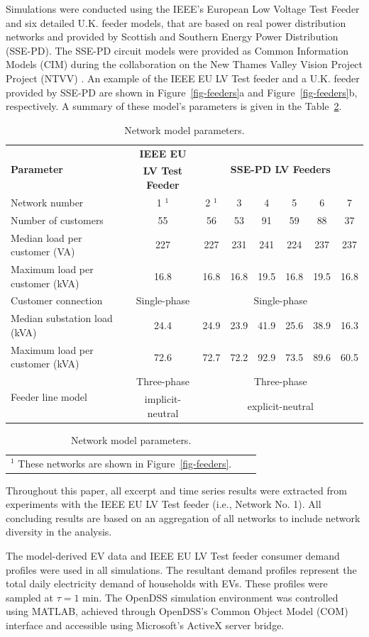 Simulations were conducted using the IEEE's European Low Voltage Test Feeder \cite{EULVFeeder2015} and six detailed U.K. feeder models, that are based on real power distribution networks and provided by Scottish and Southern Energy Power Distribution (SSE-PD). The SSE-PD circuit models were provided as Common Information Models (CIM) during the collaboration on the New Thames Valley Vision Project Project (NTVV) \cite{NTVV2016}. An example of the IEEE EU LV Test feeder and a U.K. feeder provided by SSE-PD are shown in Figure~\ref{fig-feeders}a and Figure~\ref{fig-feeders}b, respectively. A summary of these model's parameters is given in the Table~\ref{table-model-parameters}.

\begin{table}\centering
\begin{tabular}{lccccccc}%
\multirow{2}{*}{\textbf{Parameter}} & \textbf{IEEE EU} & \multicolumn{6}{c}{\multirow{2}{*}{\textbf{SSE-PD LV Feeders}}}\\
 & \textbf{LV Test Feeder} & \\
\hline
Network number & 1 $^1$ & 2 $^1$ & 3 & 4 & 5 & 6 & 7\\
\hline
Number of customers & 55 & 56 & 53 & 91 & 59 & 88 & 37\\
\hline
Median load per customer (VA) & 227 & 227 & 231 & 241 & 224 & 237 & 237\\
\hline
Maximum load per customer (kVA)& 16.8 & 16.8 & 16.8 & 19.5 & 16.8 & 19.5 & 16.8\\
\hline
Customer connection & Single-phase & \multicolumn{6}{c}{Single-phase}\\
\hline
Median substation load (kVA)& 24.4 & 24.9 & 23.9 & 41.9 & 25.6 & 38.9 & 16.3\\
\hline
Maximum load per customer (kVA)& 72.6 & 72.7 & 72.2 & 92.9 & 73.5 & 89.6 & 60.5\\ 
\hline
\multirow{2}{*}{Feeder line model} & Three-phase & \multicolumn{6}{c}{Three-phase}\\
 & implicit-neutral & \multicolumn{6}{c}{explicit-neutral}\\
\end{tabular}
\caption{Network model parameters.}
\label{table-model-parameters}
\begin{tabular}{ccc}
\multicolumn{1}{c}{\footnotesize $^1$ These networks are shown in Figure~\ref{fig-feeders}.}
\end{tabular}
\end{table}

Throughout this paper, all excerpt and time series results were extracted from experiments with the IEEE EU LV Test feeder (i.e., Network No. 1). All concluding results are based on an aggregation of all networks to include network diversity in the analysis.

The model-derived EV data and IEEE EU LV Test feeder consumer demand profiles were used in all simulations. The resultant demand profiles represent the total daily electricity demand of households with EVs. These profiles were sampled at $\tau = 1\text{ min}$. The OpenDSS simulation environment was controlled using MATLAB, achieved through OpenDSS's Common Object Model (COM) interface and accessible using Microsoft's ActiveX server bridge.